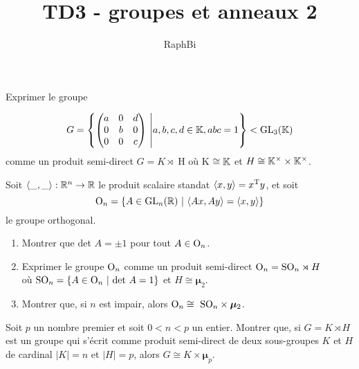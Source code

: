 \documentclass[french,a4paper,10pt]{article}
\title{\color{astral} \sffamily \bfseries TD3 - groupes et anneaux 2}
\author{RaphBi}
\begin{document}
    \maketitle
    \begin{td-exo}[1]
        Exprimer le groupe

        $$G = \left\{\begin{pmatrix}
            a & 0 & d\\
            0 & b & 0\\
            0 & 0 & c \end{pmatrix}\ 
            \middle| a,b,c,d \in \bb K, abc=1\right\} < \textmd{GL}_3(\bb K)$$
        comme un produit semi-direct $G = K \rtimes$ H où K $\cong \mathbb{K}$ et $H \cong \mathbb{K}^\times \times \mathbb{K}^\times$.
    \end{td-exo}

    \begin{td-exo}[2]
        Soit $\langle \_,\_\rangle: \mathbb{R}^n \rightarrow \mathbb{R}$ le produit scalaire standat $\langle x,y\rangle = x^\textmd{T}y$, et soit
        $$\textmd{O}_n = \left\{ A\in \textmd{GL}_n(\mathbb{R})\ | \ \langle Ax,Ay\rangle = \langle x,y \rangle \right\}$$ le groupe orthogonal.
        \begin{enumerate}[($i$)]
            \item Montrer que det $A = \pm 1$ pour tout $A\in \textmd{O}_n$.
            \item Exprimer le groupe $\textmd{O}_n$ comme un produit semi-direct $\textmd{O}_n = \textmd{SO}_n \rtimes H$\\
            où $\textmd{SO}_n = \{A\in \textmd{O}_n \ | \ \textmd{det} \ A = 1\}$ et $H \cong \bm{\mu}_2$.
            \item Montrer que, si $n$ est impair, alors $\textmd{O}_n \cong \ \textmd{SO}_n \times \bm{\mu}_2$.
        \end{enumerate}
    \end{td-exo}

    \begin{td-exo}[3]
        Soit $p$ un nombre premier et soit $0<n<p$ un entier. Montrer que, si $G = K \rtimes H$ est un groupe qui s'écrit comme produit
        semi-direct de deux sous-groupes $K$ et $H$ de cardinal $|K| = n$ et $|H|=p$, alors $G \cong K \times \bm{\mu}_p$.
    \end{td-exo}
    
\end{document}
